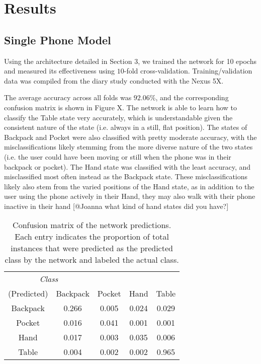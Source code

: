 \section{Results}
\subsection{Single Phone Model}
Using the architecture detailed in Section 3, we trained the network for 10 epochs
and measured its effectiveness using $10$-fold cross-validation.
Training/validation data was compiled from the diary study conducted with the Nexus 5X.

The average accuracy across all folds was $92.06\%$, and the corresponding
confusion matrix is shown in Figure X. The network is able to learn how to 
classify the Table state very accurately, which is understandable given 
the consistent nature of the state (i.e. always in a still, flat position). The states
of Backpack and Pocket were also classified with pretty moderate accuracy,
with the misclassifications likely stemming from the more diverse nature of 
the two states (i.e. the user could have been moving or still when the phone was
in their backpack or pocket). The Hand state was classified with the least accuracy,
and misclassified most often instead as the Backpack state. These misclassifications
likely also stem from the varied positions of the Hand state, as in addition to the user
using the phone actively in their Hand, they may also walk with their phone inactive
in their hand [@Joanna what kind of hand states did you have?]


\begin{table}[h]
\caption{Confusion matrix of the network predictions. Each entry indicates the proportion of
total instances that were predicted as the predicted class by the network and labeled the actual class.}\label{fig:confusion} \centering
\begin{tabular}{| c || c | c | c | c }  
\toprule
\multicolumn{2}{c}{\textit{Class}}\multicolumn{3}{c}{(Actual)} \\ \cmidrule{1-5}
(Predicted)		&	Backpack    & 	Pocket 	& 	Hand	&	Table \\
\midrule
Backpack			&	0.266 	&	0.005	&	0.024 	&	0.029 \\
Pocket			&	0.016 	&	0.041 	&	0.001 	&	0.001 \\
Hand			&	0.017 	&	0.003 	&	0.035 	&	0.006 \\
Table			&	0.004 	&	0.002 	&	0.002 	&	0.965\\
\bottomrule
\end{tabular}
\end{table}


